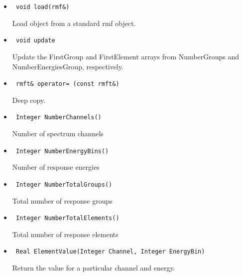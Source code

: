 \documentclass[11pt]{book}
\begin{document}
\begin{itemize}


\item  \begin{verbatim} void load(rmf&) \end{verbatim}

          Load object from a standard rmf object.

\item  \begin{verbatim} void update \end{verbatim}

          Update the FirstGroup and FirstElement arrays from 
          NumberGroups and NumberEnergiesGroup, respectively.

\item  \begin{verbatim} rmft& operator= (const rmft&) \end{verbatim}

          Deep copy.

\item  \begin{verbatim} Integer NumberChannels() \end{verbatim}

          Number of spectrum channels 

\item  \begin{verbatim} Integer NumberEnergyBins() \end{verbatim}

          Number of response energies 

\item  \begin{verbatim} Integer NumberTotalGroups() \end{verbatim}

          Total number of response groups 

\item  \begin{verbatim} Integer NumberTotalElements() \end{verbatim}

          Total number of response elements 

\item  \begin{verbatim} Real ElementValue(Integer Channel, Integer EnergyBin) \end{verbatim}

          Return the value for a particular channel and energy.


\end{itemize}
\end{document}
